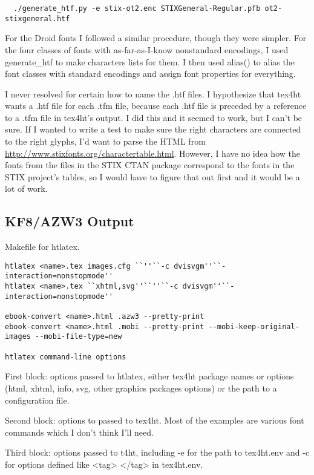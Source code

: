 \documentclass[12pt]{article}
\begin{document}
\begin{lstlisting}
  ./generate_htf.py -e stix-ot2.enc STIXGeneral-Regular.pfb ot2-stixgeneral.htf
\end{lstlisting}

For the Droid fonts I followed a similar procedure, though they were
simpler.  For the four classes of fonts with as-far-as-I-know
nonstandard encodings, I used generate\_htf to make characters lists
for them.  I then used alias() to alias the font classes with standard
encodings and assign font properties for everything.

I never resolved for certain how to name the .htf files.  I
hypothesize that tex4ht wants a .htf file for each .tfm file, because
each .htf file is preceded by a reference to a .tfm file in tex4ht's
output.  I did this and it seemed to work, but I can't be sure.  If I
wanted to write a test to make sure the right characters are connected
to the right glyphs, I'd want to parse the HTML from
\url{http://www.stixfonts.org/charactertable.html}. However, I have no
idea how the fonts from the files in the STIX CTAN package correspond
to the fonts in the STIX project's tables, so I would have to figure
that out first and it would be a lot of work.


\subsection{KF8/AZW3 Output}
\label{sec:kf8/azw3_output}

Makefile for htlatex.

\begin{lstlisting}
htlatex <name>.tex images.cfg ``''``-c dvisvgm''``-interaction=nonstopmode''
htlatex <name>.tex ``xhtml,svg''``''``-c dvisvgm''``-interaction=nonstopmode''

ebook-convert <name>.html .azw3 --pretty-print
ebook-convert <name>.html .mobi --pretty-print --mobi-keep-original-images --mobi-file-type=new

htlatex command-line options
\end{lstlisting}

First block: options passed to htlatex, either tex4ht package names or
options (html, xhtml, info, svg, other graphics packages options) or
the path to a configuration file.

Second block: options to passed to tex4ht.  Most of the examples are
various font commands which I don't think I'll need.

Third block: options passed to t4ht, including -e for the path to
tex4ht.env and -c for options defined like <tag> </tag> in
tex4ht.env.  
\end{document}
